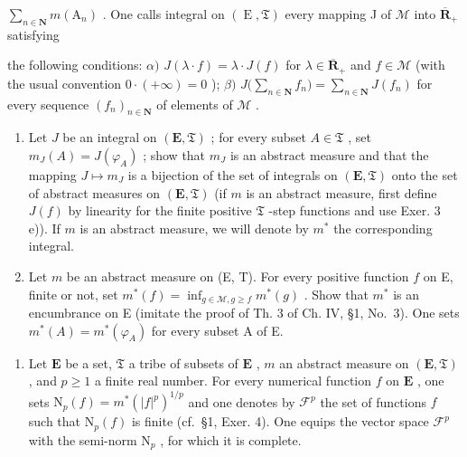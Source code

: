 \(\sum_{n\in \mathbf{N}}m(\mathrm{A}_n)\) . One calls integral on \((\operatorname {E},\mathfrak{T})\) every mapping J of \(\mathcal{M}\) into \(\overline{\mathbf{R}}_+\) satisfying

  the following conditions: \(\alpha)\) \(J(\lambda \cdot f) = \lambda \cdot J(f)\) for \(\lambda \in \overline{\mathbf{R}}_{+}\) and \(f \in \mathcal{M}\) (with the usual convention \(0 \cdot (+\infty) = 0\) ); \(\beta)\) \(J\big(\sum_{n \in \mathbf{N}} f_n\big) = \sum_{n \in \mathbf{N}} J(f_n)\) for every sequence \((f_n)_{n \in \mathbf{N}}\) of elements of \(\mathcal{M}\) .


\begin{enumerate}
\def\labelenumi{\alph{enumi})}
\item
  Let \(J\) be an integral on \((\mathbf{E},\mathfrak{T})\) ; for every subset \(A \in \mathfrak{T}\) , set \(m_{J}(A) = J(\varphi_A)\) ; show that \(m_J\) is an abstract measure and that the mapping \(J \mapsto m_J\) is a bijection of the set of integrals on \((\mathbf{E},\mathfrak{T})\) onto the set of abstract measures on \((\mathbf{E},\mathfrak{T})\) (if \(m\) is an abstract measure, first define \(J(f)\) by linearity for the finite positive \(\mathfrak{T}\) -step functions and use Exer. 3 e)). If \(m\) is an abstract measure, we will denote by \(m^*\) the corresponding integral.
\item
  Let \(m\) be an abstract measure on (E, T). For every positive function \(f\) on E, finite or not, set \(m^{*}(f) = \inf_{g \in \mathcal{M}, g \geqslant f} m^{*}(g)\) . Show that \(m^{*}\) is an encumbrance on E (imitate the proof of Th. 3 of Ch. IV, §1, No.~3). One sets \(m^{*}(A) = m^{*}(\varphi_{A})\) for every subset A of E.
\end{enumerate}

\begin{enumerate}
\def\labelenumi{\arabic{enumi})}
\setcounter{enumi}{4}
\tightlist
\item
  Let \(\mathbf{E}\) be a set, \(\mathfrak{T}\) a tribe of subsets of \(\mathbf{E}\) , \(m\) an abstract measure on \((\mathbf{E},\mathfrak{T})\) , and \(p\geqslant 1\) a finite real number. For every numerical function \(f\) on \(\mathbf{E}\) , one sets \(\mathrm{N}_p(f) = m^* (|f|^p)^{1 / p}\) and one denotes by \(\mathcal{F}^p\) the set of functions \(f\) such that \(\mathrm{N}_p(f)\) is finite (cf.~§1, Exer. 4). One equips the vector space \(\mathcal{F}^p\) with the semi-norm \(\mathrm{N}_p\) , for which it is complete.
\end{enumerate}

